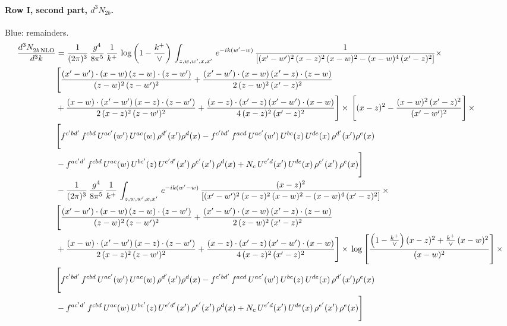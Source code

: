 \documentclass[10pt]{article}
\numberwithin{equation}{section}
\newcommand{\new}[1]{{\color{blue}#1}}
\begin{document}
\paragraph{Row I, second part, $d^3N_{2b}$.}
\new{Blue}: remainders.
\begin{align}
    \frac{d^{3}N_{2b\,\rm NLO}^{\rm}}{d^{3}k}  & =  \frac{1}{(2\pi)^{3}}\, \frac{g^{4}}{8\pi^{5}}\,\frac{1}{k^{+}}\,\log{\left(1-\frac{k^{+}}{\vee}\right)}\,\int_{z,w,w^{\prime},x,x'}\, e^{-ik(w^{\prime}-w)}\, \frac{1}{\left[(x'-w')^{2}\,(x-z)^{2}\,(x-w)^{2} - (x-w)^{4}\, (x'-z)^{2}\right]} \times\notag \\ & \Bigg[\frac{(x'-w')\cdot (x-w)\, (z-w)\cdot (z-w')}{(z-w)^{2}\, (z-w')^{2}}+\frac{(x'-w')\cdot (x-w)\, (x'-z)\cdot (z-w)}{2\, (z-w)^{2}\, (x'-z)^{2}}\notag \\ & +\frac{(x-w)\cdot (x'-w')\, (x-z)\cdot (z-w')}{2\, (x-z)^{2}\, (z-w')^{2}}+\frac{(x-z)\cdot (x'-z)\, (x'-w')\cdot (x-w)}{4\, (x-z)^{2}\, (x'-z)^{2}}\Bigg] \times\,\Bigg[(x-z)^{2} - \frac{(x-w)^{2}\, (x'-z)^{2}}{(x'-w')^{2}}\Bigg]\,\times \notag \\ & \Bigg[f^{c'bd'}\,f^{cbd}\, U^{ac'}(w')\,U^{ac}(w)\,\rho^{d'}(x')\rho^{d}(x)- f^{c'bd'}\,f^{acd}\,U^{ac'}(w')\,U^{bc}(z)\,U^{de}(x)\,\rho^{d'}(x')\rho^{e}(x) \notag \\ & -f^{ac'd'}\,f^{cbd}\,U^{ac}(w)\,U^{bc'}(z)\,U^{e'd'}(x')\,\rho^{e'}(x')\,\rho^{d}(x) +N_{c}\,U^{e'd}(x')\,U^{de}(x)\,\rho^{e'}(x')\,\rho^{e}(x)\Bigg] \notag \\
&  - \frac{1}{(2\pi)^{3}}\, \frac{g^{4}}{8\pi^{5}}\,\frac{1}{k^{+}}\,\int_{z,w,w^{\prime},x,x'}\, e^{-ik(w^{\prime}-w)}\, \frac{(x-z)^{2}}{\left[(x'-w')^{2}\,(x-z)^{2}\,(x-w)^{2} - (x-w)^{4}\, (x'-z)^{2}\right]}\,  \times\notag \\ & \Bigg[\frac{(x'-w')\cdot (x-w)\, (z-w)\cdot (z-w')}{(z-w)^{2}\, (z-w')^{2}}+\frac{(x'-w')\cdot (x-w)\, (x'-z)\cdot (z-w)}{2\, (z-w)^{2}\, (x'-z)^{2}}\notag \\ & +\frac{(x-w)\cdot (x'-w')\, (x-z)\cdot (z-w')}{2\, (x-z)^{2}\, (z-w')^{2}}+\frac{(x-z)\cdot (x'-z)\, (x'-w')\cdot (x-w)}{4\, (x-z)^{2}\, (x'-z)^{2}}\Bigg] \times\,\log{\left[\frac{\left(1-\frac{k^{+}}{\vee}\right)(x-z)^{2}+\frac{k^{+}}{\vee}\,(x-w)^{2}}{(x-w)^{2}}\right]}\,\times \notag \\ & \Bigg[f^{c'bd'}\,f^{cbd}\, U^{ac'}(w')\,U^{ac}(w)\,\rho^{d'}(x')\rho^{d}(x)- f^{c'bd'}\,f^{acd}\,U^{ac'}(w')\,U^{bc}(z)\,U^{de}(x)\,\rho^{d'}(x')\rho^{e}(x) \notag \\ & -f^{ac'd'}\,f^{cbd}\,U^{ac}(w)\,U^{bc'}(z)\,U^{e'd'}(x')\,\rho^{e'}(x')\,\rho^{d}(x) +N_{c}\,U^{e'd}(x')\,U^{de}(x)\,\rho^{e'}(x')\,\rho^{e}(x)\Bigg] \notag \\

\end{align}
\end{document}
